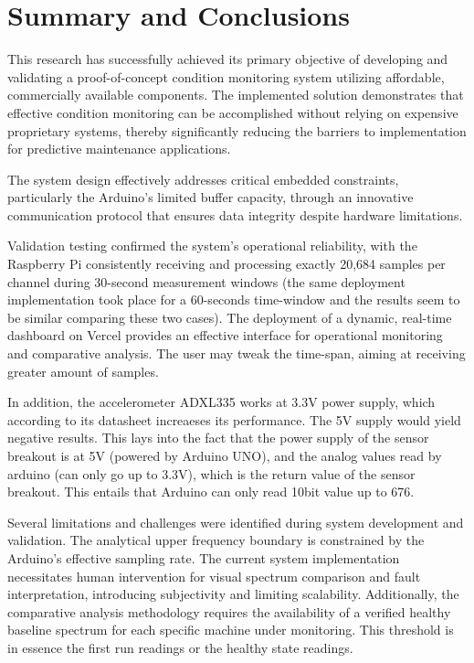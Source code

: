 {\section{Summary and Conclusions}

This research has successfully achieved its primary objective of developing and validating a proof-of-concept condition monitoring system utilizing affordable, commercially available components. The implemented solution demonstrates that effective condition monitoring can be accomplished without relying on expensive proprietary systems, thereby significantly reducing the barriers to implementation for predictive maintenance applications. 

The system design effectively addresses critical embedded constraints, particularly the Arduino's limited buffer capacity, through an innovative communication protocol that ensures data integrity despite hardware limitations. 

Validation testing confirmed the system's operational reliability, with the Raspberry Pi consistently receiving and processing exactly 20,684 samples per channel during 30-second measurement windows (the same deployment implementation took place for a 60-seconds time-window and the results seem to be similar comparing these two cases). The deployment of a dynamic, real-time dashboard on Vercel provides an effective interface for operational monitoring and comparative analysis. The user may  tweak the time-span, aiming at receiving greater amount of samples.

In addition, the accelerometer ADXL335 works at 3.3V power supply, which according to its datasheet increaeses its performance. The 5V supply would yield negative results. This lays into the fact that the power supply of the sensor breakout is at 5V (powered by Arduino UNO), and the analog values read by arduino (can only go up to 3.3V), which is the return value of the sensor breakout. This entails that Arduino can only read 10bit value up to 676.

Several limitations and challenges were identified during system development and validation. The analytical upper frequency boundary is constrained by the Arduino's effective sampling rate. The current system implementation necessitates human intervention for visual spectrum comparison and fault interpretation, introducing subjectivity and limiting scalability. Additionally, the comparative analysis methodology requires the availability of a verified healthy baseline spectrum for each specific machine under monitoring. This threshold is in essence the first run readings or the healthy state readings.

}
